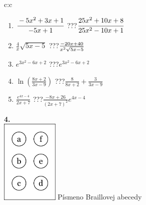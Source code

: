 \documentclass[10pt]{report}
\begin{document}
\begin{tabular}{c:c}
\begin{minipage}[c][104.5mm][t]{0.5\linewidth}
\begin{center}
\begin{minipage}{0.79\linewidth}
\begin{center}
\begin{varwidth}{\linewidth}
\begin{enumerate}
\item $\cfrac{-5x^2+3x+1}{-5x+1}$\quad \dotfill\; ???\;\dotfill \quad $\cfrac{25x^2+10x+8}{25x^2-10x+1}$
\item $\frac{4}{x}\sqrt{5x-5}$\quad \dotfill\; ???\;\dotfill \quad $\frac{-20x+40}{x^2 \sqrt{\smash[b]{5x-5}}}$
\item $e^{3x^2-6x+2}$\quad \dotfill\; ???\;\dotfill \quad $e^{3x^2-6x+2}$
\item $\ln{\left(\frac{8x+2}{3x-9}\right)}$\quad \dotfill\; ???\;\dotfill \quad $\frac{8}{8x+2}+\frac{3}{3x-9}$
\item $\frac{e^{4x-4}}{2x+7}$\quad \dotfill\; ???\;\dotfill \quad $\frac{-8x+26}{(2x+7)^2}e^{4x-4}$
\end{enumerate}
\end{varwidth}
\end{center}
\end{minipage}
\begin{minipage}{0.20\linewidth}
\begin{center}
{\Huge\bfseries 4.} \\[2mm]
\includegraphics[height=40mm]{../images/braille.png}
{\small Písmeno Braillovej abecedy}
\end{center}
\end{minipage}
\end{center}
\end{minipage}
%
\end{tabular}
\newpage
\thispagestyle{empty}
\end{document}
